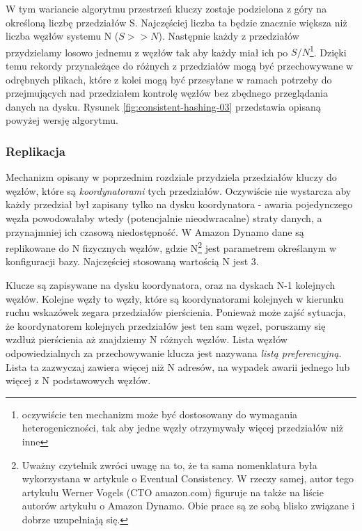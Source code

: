 W tym wariancie algorytmu przestrzeń kluczy zostaje podzielona z góry na określoną liczbę przedziałów S.
Najczęściej liczba ta będzie znacznie większa niż liczba węzłów systemu N ($S >> N$).
Następnie każdy z przedziałów przydzielamy losowo jednemu z węzłów tak aby każdy miał ich po $S/N$\footnote{oczywiście ten mechanizm może być dostosowany do wymagania heterogeniczności, tak aby jedne węzły otrzymywały więcej przedziałów niż inne}.
Dzięki temu rekordy przynależące do różnych z przedziałów mogą być przechowywane w odrębnych plikach, które z kolei mogą być przesyłane w ramach potrzeby do przejmujących nad przedziałem kontrolę węzłów bez zbędnego przeglądania danych na dysku.
Rysunek \ref{fig:consistent-hashing-03} przedstawia opisaną powyżej wersję algorytmu.


\subsubsection*{Replikacja}

Mechanizm opisany w poprzednim rozdziale przydziela przedziałów kluczy do węzłów, które są \emph{koordynatorami} tych przedziałów.
Oczywiście nie wystarcza aby każdy przedział był zapisany tylko na dysku koordynatora - awaria pojedynczego węzła powodowałaby wtedy (potencjalnie nieodwracalne) straty danych, a przynajmniej ich czasową niedostępność.
W Amazon Dynamo dane są replikowane do N fizycznych węzłów, gdzie N\footnote{
Uważny czytelnik zwróci uwagę na to, że ta sama nomenklatura była wykorzystana w artykule o Eventual Consistency.
W rzeczy samej, autor tego artykułu Werner Vogels (CTO amazon.com) figuruje na także na liście autorów artykułu o Amazon Dynamo.
Obie prace są ze sobą blisko związane i dobrze uzupełniają się.
}
jest parametrem określanym w konfiguracji bazy.
Najczęściej stosowaną wartością N jest 3.

Klucze są zapisywane na dysku koordynatora, oraz na dyskach N-1 kolejnych węzłów.
Kolejne węzły to węzły, które są koordynatorami kolejnych w kierunku ruchu wskazówek zegara przedziałów pierścienia.
Ponieważ może zajść sytuacja, że koordynatorem kolejnych przedziałów jest ten sam węzeł, poruszamy się wzdłuż pierścienia aż znajdziemy N różnych węzłów.
Lista węzłów odpowiedzialnych za przechowywanie klucza jest nazywana \emph{listą preferencyjną}.
Lista ta zazwyczaj zawiera więcej niż N adresów, na wypadek awarii jednego lub więcej z N podstawowych węzłów.

